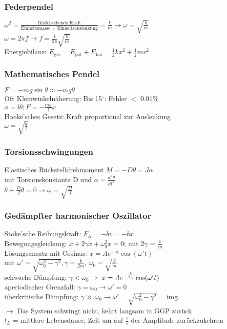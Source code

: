 \documentclass[fs, footer]{latex4ei}
\begin{document}
\begin{multicols*}{4}
\subsubsection{Federpendel}
$\omega ^2 = \frac{\text{Rücktreibende Kraft}}{\text{Einheitsmasse $\times$ Einheitsauslenkung}} = \frac{k}{m} \rightarrow \omega = \sqrt{\frac{k}{m}}$\\
$\omega= 2 \pi f \rightarrow f = \frac{1}{2\pi}\sqrt{\frac{k}{m}}$\\
Energiebilanz: $E_{\text{ges}} = E_{\text{pot}} + E_{\text{kin}} = \frac{1}{2}kx^2+\frac{1}{2}mv^2$\\
\subsubsection{Mathematisches Pendel} 
$F = -mg \sin \theta \approx -mg \theta$\\
Oft Kleinwinkelnäherung: Bis 15$^{\circ}$: Fehler $<$ 0.01\%\\ %
$x = l\theta ; F=-\frac{mg}{l}x$\\
Hooke'sches Gesetz: Kraft proportional zur Auslenkung\\
$\omega = \sqrt{\frac{g}{l}}$
\subsubsection{Torsionsschwingungen}
Elastisches Rückstelldrehmoment $M = -D\theta = J\alpha$\\ mit Torsionskonstante D und $\alpha = \frac{d^2 \theta}{dt^2}$\\
$\ddot{\theta}+\frac{D}{J}\theta = 0 \Rightarrow \omega = \sqrt{\frac{D}{J}}$\\
\subsubsection{Gedämpfter harmonischer Oszillator}
Stoke'sche Reibungskraft: $F_R = -bv = -b\dot{x}$\\
Bewegungsgleichung: $\ddot{x} + 2\gamma \dot{x} + \omega_0^2x = 0$; mit 2$\gamma$ = $\frac{b}{m}$\\
Lösungsansatz mit Cosinus: $x = Ae^{-\gamma t} \cos(\omega 't)$ \\mit $\omega ' = \sqrt{\omega_0^2-\gamma^2}, \gamma = \frac{b}{2m}$, $\omega_0 = \sqrt{\frac{k}{m}}$\\
schwache Dämpfung: $\gamma < \omega_0 \rightarrow$ $x = Ae^{- \frac{t}{t_{\text{\tiny L}}}} \cos(\omega 't)$\\
aperiodischer Grenzfall: $\gamma = \omega_0 \rightarrow	\omega' = 0$\\
überkritische Dämpfung: $\gamma \gg \omega_0 \rightarrow \omega' = \sqrt{\omega_0^2 - \gamma^2}$ = img.\\ $\rightarrow$ Das System schwingt nicht, kehrt langsam in GGP zurück\\
$t_L$ = mittlere Lebensdauer, Zeit um auf $\frac{1}{e}$ der Amplitude zurückzukehren\\


\end{multicols*}
\end{document}
